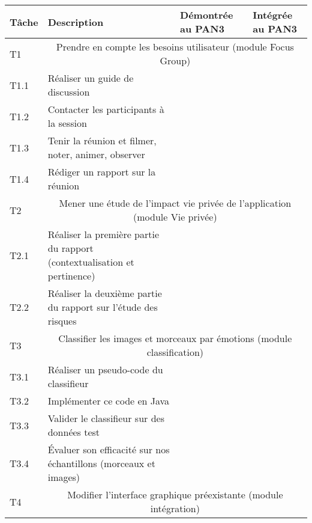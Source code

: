 \begin{tabular}{llm{1.5cm}m{1.5cm}}
	Tâche & Description                                                              & Démontrée au PAN3    & Intégrée au PAN3    \\
	\hline \hline
	T1    & \multicolumn{3}{c}{\cellcolor{LightSteelBlue} Prendre en compte les besoins utilisateur (module Focus Group)}         \\
	T1.1  & Réaliser un guide de discussion                                          &                      & \cs                 \\
	T1.2  & Contacter les participants à la session                                  &                      & \cs                 \\
	T1.3  & Tenir la réunion et filmer, noter, animer, observer                      &                      & \cs                 \\
	T1.4  & Rédiger un rapport sur la réunion                                        &                      & \cs                 \\
	\hline
	T2    & \multicolumn{3}{c}{\cellcolor{LightSteelBlue} Mener une étude de l'impact vie privée de l'application (module Vie privée)}     \\
	T2.1  & Réaliser la première partie du rapport (contextualisation et pertinence) &                      & \cs                 \\
	T2.2  & Réaliser la deuxième partie du rapport sur l'étude des risques           &                      & \cs                 \\
	\hline
	T3    & \multicolumn{3}{c}{\cellcolor{LightSteelBlue} Classifier les images et morceaux par émotions (module classification)} \\
	T3.1  & Réaliser un pseudo-code du classifieur                                   &                      & \cs                 \\
	T3.2  & Implémenter ce code en Java                                              & \cs                  &                     \\
	T3.3  & Valider le classifieur sur des données test                              & \cs                  &                     \\
	T3.4  & Évaluer son efficacité sur nos échantillons (morceaux et images)         & \cs                  &                     \\
	\hline
	T4    & \multicolumn{3}{c}{\cellcolor{LightSteelBlue} Modifier l'interface graphique préexistante (module intégration)}       \\

\end{tabular}
